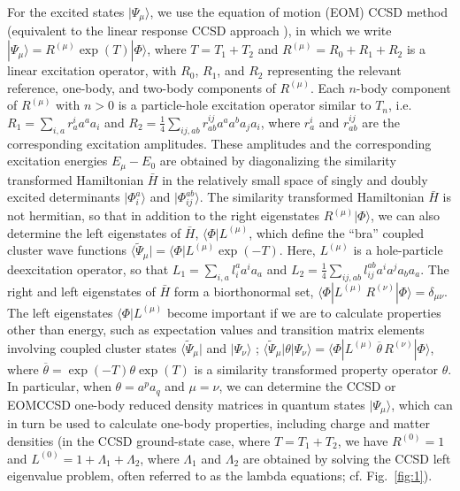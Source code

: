 \documentclass[epj]{svjour}
\begin{document}
For the excited states $|\Psi_{\mu}\rangle$, we use
the equation of motion (EOM) CCSD method \cite{stanton93}
(equivalent to the linear response CCSD approach \cite{monkhorst77}),
in which we write
$|\Psi_{\mu}\rangle=R^{(\mu)} \exp(T) |\Phi\rangle$,
where $T = T_{1} + T_{2}$ and $R^{(\mu)} = R_{0}+ R_{1} + R_{2}$ is
a linear excitation operator, with $R_{0}$, $R_{1}$, and $R_{2}$
representing the relevant reference, one-body, and two-body components of
$R^{(\mu)}$.
Each $n$-body component of $R^{(\mu)}$ with $n>0$ is a particle-hole
excitation operator similar to $T_{n}$, i.e.
$R_1=\sum_{i,a} r_a^i a^{a} a_{i}$ and
$R_2= \frac{1}{4} \sum_{ij,ab} r_{ab}^{ij} a^{a} a^{b} a_{j} a_{i}$, where
$r_a^i$ and $r_{ab}^{ij}$ are the corresponding excitation amplitudes.
These amplitudes and the corresponding excitation energies
$E_{\mu}-E_{0}$ are
obtained by diagonalizing the similarity transformed Hamiltonian $\bar{H}$
in the relatively small space of singly and doubly
excited determinants $|\Phi_{i}^{a}\rangle$ and $|\Phi_{ij}^{ab}\rangle$.
The similarity transformed Hamiltonian $\bar{H}$ is not hermitian, so
that in addition to the right eigenstates $R^{(\mu)} |\Phi\rangle$, we
can also determine the left eigenstates of $\bar{H}$,
$\langle \Phi | L^{(\mu)}$, which define the ``bra'' coupled cluster wave functions
$\langle \tilde{\Psi}_{\mu}| = \langle \Phi | L^{(\mu)} \exp(-T)$.
Here, $L^{(\mu)}$ is a hole-particle deexcitation operator, so that
$L_1=\sum_{i,a} l_i^a a^{i} a_{a}$ and
$L_2= \frac{1}{4} \sum_{ij,ab} l_{ij}^{ab} a^{i} a^{j} a_{b} a_{a}$.
The right and left eigenstates of $\bar{H}$ form a biorthonormal set,
$\langle \Phi | L^{(\mu)} \, R^{(\nu)} | \Phi\rangle
= \delta_{\mu\nu}$. The left eigenstates $\langle \Phi | L^{(\mu)}$
become important if we are to calculate properties other than energy,
such as expectation values and transition matrix elements
involving coupled cluster states $\langle \tilde{\Psi}_{\mu}|$
and $|\Psi_{\nu} \rangle$ \cite{stanton93};
$\langle \tilde{\Psi}_{\mu}| \theta |\Psi_{\nu} \rangle =
\langle \Phi | L^{(\mu)} \, \overline{\theta} \, R^{(\nu)} |\Phi \rangle$,
where $\overline{\theta} =  \exp(-T) \theta \exp(T)$ is a similarity transformed
property operator $\theta$. In particular,
when $\theta = a^{p} a_{q}$ and $\mu=\nu$, we can determine
the CCSD or EOMCCSD one-body 
reduced density matrices in quantum states $|\Psi_{\mu} \rangle$, which can in turn
be used to calculate one-body properties, including charge and
matter densities
(in the CCSD ground-state case, where $T=T_{1}+T_{2}$, we have
$R^{(0)} = 1$ and $L^{(0)} = 1 + \Lambda_{1} + \Lambda_{2}$, where
$\Lambda_{1}$ and $\Lambda_{2}$ are obtained by solving the
CCSD left eigenvalue problem, often referred to as
the lambda equations; cf. Fig.~\ref{fig:1}).
\end{document}
